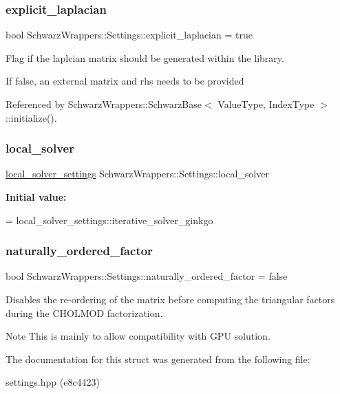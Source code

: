 \subsubsection{\texorpdfstring{explicit\+\_\+laplacian}{explicit\_laplacian}}
{\footnotesize\ttfamily bool Schwarz\+Wrappers\+::\+Settings\+::explicit\+\_\+laplacian = true}



Flag if the laplcian matrix should be generated within the library. 

If false, an external matrix and rhs needs to be provided 

Referenced by Schwarz\+Wrappers\+::\+Schwarz\+Base$<$ Value\+Type, Index\+Type $>$\+::initialize().

\mbox{\label{structSchwarzWrappers_1_1Settings_a8c46d1dc895b72927f7393c79c1ee342}} 
\subsubsection{\texorpdfstring{local\+\_\+solver}{local\_solver}}
{\footnotesize\ttfamily \hyperlink{structSchwarzWrappers_1_1Settings_abb00a70a7c715c93a2e7570ad6dc1bbe}{local\+\_\+solver\+\_\+settings} Schwarz\+Wrappers\+::\+Settings\+::local\+\_\+solver}

{\bfseries Initial value\+:}
\begin{DoxyCode}
=
        local\_solver\_settings::iterative\_solver\_ginkgo
\end{DoxyCode}
\mbox{\label{structSchwarzWrappers_1_1Settings_afd0d2bf6e98da07012fd08260114de17}} 
\subsubsection{\texorpdfstring{naturally\+\_\+ordered\+\_\+factor}{naturally\_ordered\_factor}}
{\footnotesize\ttfamily bool Schwarz\+Wrappers\+::\+Settings\+::naturally\+\_\+ordered\+\_\+factor = false}



Disables the re-\/ordering of the matrix before computing the triangular factors during the C\+H\+O\+L\+M\+OD factorization. 

\begin{DoxyNote}{Note}
This is mainly to allow compatibility with G\+PU solution. 
\end{DoxyNote}


The documentation for this struct was generated from the following file\+:\begin{DoxyCompactItemize}
\item 
settings.\+hpp (e8c4423)\end{DoxyCompactItemize}
